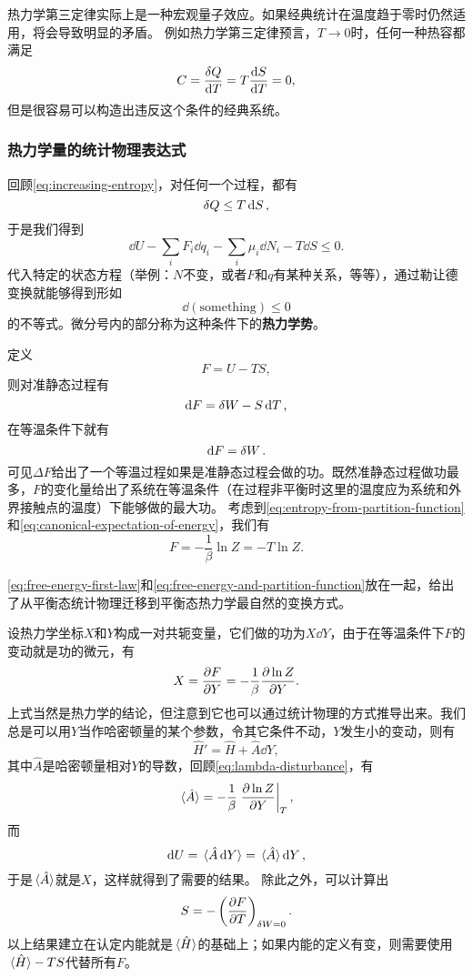 \documentclass[hyperref, UTF8, a4paper]{ctexart}
\begin{document}
热力学第三定律实际上是一种宏观量子效应。如果经典统计在温度趋于零时仍然适用，将会导致明显的矛盾。
例如热力学第三定律预言，$T\to 0$时，任何一种热容都满足
\[
    C = \frac{\var{Q}}{\dd{T}} = T \frac{\dd{S}}{\dd{T}} = 0,
\]
但是很容易可以构造出违反这个条件的经典系统。

\subsubsection{热力学量的统计物理表达式}

回顾\eqref{eq:increasing-entropy}，对任何一个过程，都有
\[
    \var{Q} \leq T \dd{S},
\]
于是我们得到
\begin{equation}
    \dd{U} - \sum_i F_i \dd{q_i} - \sum_i \mu_i \dd{N_i} - T \dd{S} \leq 0.
\end{equation}
代入特定的状态方程（举例：$N$不变，或者$F$和$q$有某种关系，等等），通过勒让德变换就能够得到形如
\[
    \dd{(\text{something})} \leq 0
\]
的不等式。微分号内的部分称为这种条件下的\textbf{热力学势}。

定义
\begin{equation}
    F = U - TS, 
\end{equation}
则对准静态过程有
\begin{equation}
    \dd{F} = \var{W} - S \dd{T},
    \label{eq:free-energy-first-law}
\end{equation}
在等温条件下就有
\[
    \dd{F} = \var{W}.
\]
可见$\Delta F$给出了一个等温过程如果是准静态过程会做的功。既然准静态过程做功最多，$F$的变化量给出了系统在等温条件（在过程非平衡时这里的温度应为系统和外界接触点的温度）下能够做的最大功。
考虑到\eqref{eq:entropy-from-partition-function}和\eqref{eq:canonical-expectation-of-energy}，我们有
\begin{equation}
    F = - \frac{1}{\beta} \ln Z = - T \ln Z.
    \label{eq:free-energy-and-partition-function}
\end{equation}

\eqref{eq:free-energy-first-law}和\eqref{eq:free-energy-and-partition-function}放在一起，给出了从平衡态统计物理迁移到平衡态热力学最自然的变换方式。

设热力学坐标$X$和$Y$构成一对共轭变量，它们做的功为$X \dd{Y}$，由于在等温条件下$F$的变动就是功的微元，有
\begin{equation}
    X = \pdv{F}{Y} = -\frac{1}{\beta} \pdv{\ln Z}{Y}.
\end{equation}
上式当然是热力学的结论，但注意到它也可以通过统计物理的方式推导出来。我们总是可以用$Y$当作哈密顿量的某个参数，令其它条件不动，$Y$发生小的变动，则有
\[
    \hat{H}' = \hat{H} + \hat{A} \dd{Y},
\]
其中$\hat{A}$是哈密顿量相对$Y$的导数，回顾\eqref{eq:lambda-disturbance}，有
\[
    \expval*{\hat{A}} = - \frac{1}{\beta} \eval{\pdv{\ln Z}{Y}}_{T},
\]
而
\[
    \dd{U} = \expval*{\hat{A} \dd{Y}} = \expval*{\hat{A}} \dd{Y},
\]
于是$\expval*{\hat{A}}$就是$X$，这样就得到了需要的结果。
除此之外，可以计算出
\begin{equation}
    S = - \left( \pdv{F}{T} \right)_{\var{W}=0}.
\end{equation}
以上结果建立在认定内能就是$\expval*{\hat{H}}$的基础上；如果内能的定义有变，则需要使用$\expval*{\hat{H}} - TS$代替所有$F$。
\end{document}
